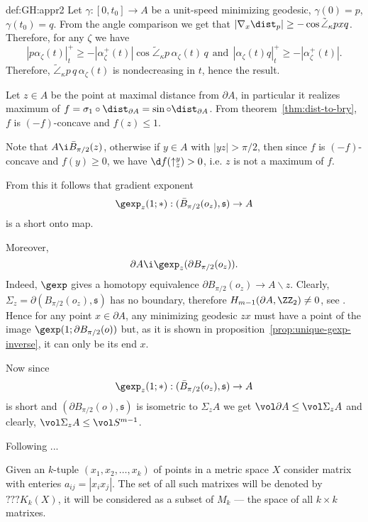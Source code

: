 {\begin{subthm}{def:GH:appr2}
 Let $\gamma:[0,t_0]\to A$ be a unit-speed minimizing geodesic,
$\gamma(0)=p$, $\gamma(t_0)=q$.
 From the angle comparison we get that $|\nabla_x\dist_p|\ge-\cos\tilde\angle_\kappa p
x q$. Therefore, for any $\zeta$ we have
$$|p\alpha_\zeta(t)|^+_t\ge -|\alpha^+_\zeta(t)|\cos\tilde\angle_\kappa
p\,\alpha_\zeta(t)\,q\ \ \text{and}\ \ |\alpha_\zeta(t)q|^+_t\ge-|\alpha^+_\zeta(t)|.$$
Therefore, $\tilde\angle_\kappa p\, q\, \alpha_\zeta(t)$ is nondecreasing in $t$, hence the result.
\qeds


Let $z\in A$ be the point at maximal distance from $\partial A$, in particular
it realizes maximum of $f=\sigma_1\circ\dist_{\partial
A}=\sin\circ\dist_{\partial A}$.
From theorem~\ref{thm:dist-to-bry}, $f$ is $(-f)$-concave and $f(z)\le 1$.

Note that $A\i \bar B_{\pi/2}(z)$, otherwise if $y\in A$ with $|y z|>\pi/2$, then
since $f$ is $(-f)$-concave and $f(y)\ge 0$, we have $\d
f(\uparrow_z^y)>0$, i.e. $z$ is not a maximum of $f$.

From this it follows that gradient exponent
$$\gexp_z(1;*):(\bar B_{\pi/2}(o_z),\mathfrak s)\to A$$
is a short onto map. 

Moreover,
$$\partial A\i\gexp_z(\partial B_{\pi/2}(o_z)).$$ 
Indeed, $\gexp$ gives a homotopy equivalence $\partial B_{\pi/2}(o_z)\to
A\backslash z$. 
Clearly, $\Sigma_z=\partial (B_{\pi/2}(o_z),\mathfrak s)$ has no boundary, therefore 
$H_{m-1}(\partial A,\ZZ_2)\not=0$, see \cite[lemma 1]{grove-petersen:rad-sphere}. 
Hence for any point $x\in\partial A$, any minimizing geodesic $z x$ must have
a point of the image $\gexp(1;\partial B_{\pi/2}(o))$ but, as it is shown in
proposition~\ref{prop:unique-gexp-inverse}, it can only be its end $x$. 

Now since $$\gexp_z(1;*):(\bar B_{\pi/2}(o_z),\mathfrak s)\to A$$ is short and
$(\partial B_{\pi/2}(o),\mathfrak s)$ is isometric to $\Sigma_z A$ we get
$\vol\partial A\le\vol \Sigma_z A$ and clearly, $\vol \Sigma_z A\le \vol S^{m-1}$.\qeds








Following \cite[3.D$_+$]{gromov-MS}...

Given an $k$-tuple $(x_1,x_2,\dots,x_k)$ of points in a metric space $X$ consider matrix with enteries $a_{ij}=|x_ix_j|$.
The set of all such matrixes will be denoted by $???K_k(X)$, it will be considered as a subset of $M_k$ --- the space of all $k\times k$ matrixes.


\end{subthm}}
